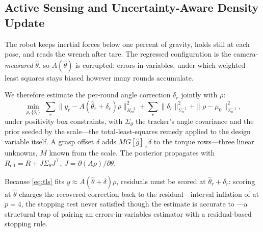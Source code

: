 \subsection{Active Sensing and Uncertainty-Aware Density Update}
\label{sec:estimation}

The robot keeps inertial forces below one percent of gravity, holds still at
each pose, and reads the wrench after tare. The regressed configuration is
the camera-\emph{measured} $\hat\theta$, so $A(\hat\theta)$ is corrupted:
errors-in-variables, under which weighted least squares stays biased however
many rounds accumulate.

We therefore estimate the per-round angle correction $\delta_r$ jointly with
$\rho$:
%
\begin{equation}
\min_{\rho,\{\delta_r\}}\;\sum_r\big\|y_r-A(\hat\theta_r+\delta_r)\rho\big\|^2
_{R_{\mathrm{eff}}^{-1}}
+\sum_r\|\delta_r\|^2_{\Sigma_\theta^{-1}}
+\|\rho-\mu_0\|^2_{\Sigma_0^{-1}},
\label{eq:tls}
\end{equation}
%
under positivity box constraints,
with $\Sigma_\theta$ the tracker's angle covariance and the prior seeded by
the scale---the total-least-squares remedy
applied to the design variable itself. A grasp offset $\delta$ adds
$MG[\hat g]_\times\delta$ to the torque rows---three linear unknowns, $M$
known from the scale. The posterior propagates
with $R_{\mathrm{eff}}=R+J\Sigma_\theta J^{\!\top}$,
$J=\partial(A\rho)/\partial\theta$.

Because \eqref{eq:tls} fits $y\approx A(\hat\theta+\delta)\rho$, residuals
must be scored at $\hat\theta_r+\delta_r$: scoring at $\hat\theta$ charges
the recovered correction back to the residual---interval inflation of
\rev{$79\times$} at $p=4$, the stopping test never satisfied though the
estimate is accurate to ---a structural trap of pairing an
errors-in-variables estimator with a residual-based stopping rule.

